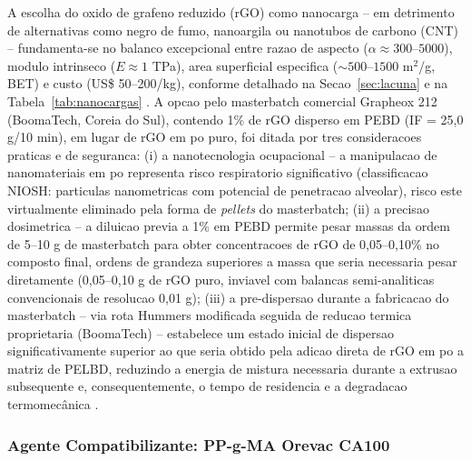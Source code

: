 \documentclass[11pt,a4paper,oneside]{article}
\begin{document}
A escolha do oxido de grafeno reduzido (rGO) como nanocarga -- em detrimento de alternativas
como negro de fumo, nanoargila ou nanotubos de carbono (CNT) -- fundamenta-se no balanco
excepcional entre razao de aspecto ($\alpha{\approx}300$--$5000$), modulo intrinseco
($E{\approx}1$ TPa), area superficial especifica (${\sim}500$--$1500$ m$^2$/g, BET) e custo
(US\$ 50--200/kg), conforme detalhado na Secao~\ref{sec:lacuna} e na Tabela~\ref{tab:nanocargas}
\cite{Potts2011, Papageorgiou2017}. A opcao pelo masterbatch comercial Grapheox 212 (BoomaTech,
Coreia do Sul), contendo 1\% de rGO disperso em PEBD (IF = 25,0 g/10 min), em lugar de rGO em
po puro, foi ditada por tres consideracoes praticas e de seguranca: (i) a nanotecnologia
ocupacional -- a manipulacao de nanomateriais em po representa risco respiratorio significativo
(classificacao NIOSH: particulas nanometricas com potencial de penetracao alveolar), risco este
virtualmente eliminado pela forma de \textit{pellets} do masterbatch; (ii) a precisao
dosimetrica -- a diluicao previa a 1\% em PEBD permite pesar massas da ordem de 5--10 g de
masterbatch para obter concentracoes de rGO de 0,05--0,10\% no composto final, ordens de
grandeza superiores a massa que seria necessaria pesar diretamente (0,05--0,10 g de rGO puro,
inviavel com balancas semi-analiticas convencionais de resolucao 0,01 g); (iii) a
pre-dispersao durante a fabricacao do masterbatch -- via rota Hummers modificada seguida de
reducao termica proprietaria (BoomaTech) -- estabelece um estado inicial de dispersao
significativamente superior ao que seria obtido pela adicao direta de rGO em po a matriz de
PELBD, reduzindo a energia de mistura necessaria durante a extrusao subsequente e,
consequentemente, o tempo de residencia e a degradacao termomecânica \cite{Faria2017, Yun2011}.

\subsubsection{Agente Compatibilizante: PP-g-MA Orevac CA100}
\end{document}
